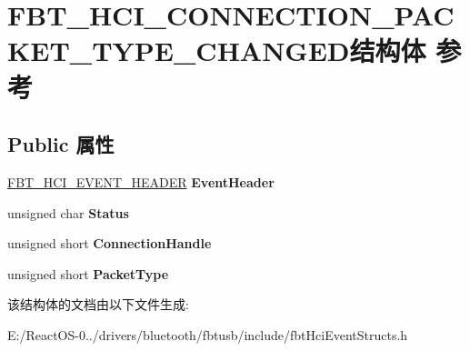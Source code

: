 \hypertarget{struct_f_b_t___h_c_i___c_o_n_n_e_c_t_i_o_n___p_a_c_k_e_t___t_y_p_e___c_h_a_n_g_e_d}{}\section{F\+B\+T\+\_\+\+H\+C\+I\+\_\+\+C\+O\+N\+N\+E\+C\+T\+I\+O\+N\+\_\+\+P\+A\+C\+K\+E\+T\+\_\+\+T\+Y\+P\+E\+\_\+\+C\+H\+A\+N\+G\+E\+D结构体 参考}
\label{struct_f_b_t___h_c_i___c_o_n_n_e_c_t_i_o_n___p_a_c_k_e_t___t_y_p_e___c_h_a_n_g_e_d}
\subsection*{Public 属性}
\begin{DoxyCompactItemize}
\item 
\mbox{\label{struct_f_b_t___h_c_i___c_o_n_n_e_c_t_i_o_n___p_a_c_k_e_t___t_y_p_e___c_h_a_n_g_e_d_ad95dbfc010fca56233eca154e521c7f5}} 
\hyperlink{struct_f_b_t___h_c_i___e_v_e_n_t___h_e_a_d_e_r}{F\+B\+T\+\_\+\+H\+C\+I\+\_\+\+E\+V\+E\+N\+T\+\_\+\+H\+E\+A\+D\+ER} {\bfseries Event\+Header}
\item 
\mbox{\label{struct_f_b_t___h_c_i___c_o_n_n_e_c_t_i_o_n___p_a_c_k_e_t___t_y_p_e___c_h_a_n_g_e_d_acd0db072fee8e885eed307804399d366}} 
unsigned char {\bfseries Status}
\item 
\mbox{\label{struct_f_b_t___h_c_i___c_o_n_n_e_c_t_i_o_n___p_a_c_k_e_t___t_y_p_e___c_h_a_n_g_e_d_a5cb93a4d00729d88693e3e17211f3e99}} 
unsigned short {\bfseries Connection\+Handle}
\item 
\mbox{\label{struct_f_b_t___h_c_i___c_o_n_n_e_c_t_i_o_n___p_a_c_k_e_t___t_y_p_e___c_h_a_n_g_e_d_ab4e1255c287f3a726afa6167cdd3898b}} 
unsigned short {\bfseries Packet\+Type}
\end{DoxyCompactItemize}


该结构体的文档由以下文件生成\+:\begin{DoxyCompactItemize}
\item 
E\+:/\+React\+O\+S-\/0../drivers/bluetooth/fbtusb/include/fbt\+Hci\+Event\+Structs.\+h\end{DoxyCompactItemize}
